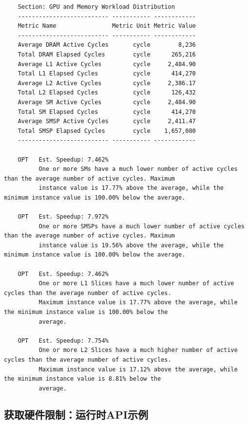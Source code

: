 \begin{lstlisting}
    Section: GPU and Memory Workload Distribution
    -------------------------- ----------- ------------
    Metric Name                Metric Unit Metric Value
    -------------------------- ----------- ------------
    Average DRAM Active Cycles       cycle        8,236
    Total DRAM Elapsed Cycles        cycle      265,216
    Average L1 Active Cycles         cycle     2,484.90
    Total L1 Elapsed Cycles          cycle      414,270
    Average L2 Active Cycles         cycle     2,386.17
    Total L2 Elapsed Cycles          cycle      126,432
    Average SM Active Cycles         cycle     2,484.90
    Total SM Elapsed Cycles          cycle      414,270
    Average SMSP Active Cycles       cycle     2,411.47
    Total SMSP Elapsed Cycles        cycle    1,657,080
    -------------------------- ----------- ------------

    OPT   Est. Speedup: 7.462%
          One or more SMs have a much lower number of active cycles than the average number of active cycles. Maximum
          instance value is 17.77% above the average, while the minimum instance value is 100.00% below the average.
 
    OPT   Est. Speedup: 7.972%
          One or more SMSPs have a much lower number of active cycles than the average number of active cycles. Maximum
          instance value is 19.56% above the average, while the minimum instance value is 100.00% below the average.
    
    OPT   Est. Speedup: 7.462%
          One or more L1 Slices have a much lower number of active cycles than the average number of active cycles.
          Maximum instance value is 17.77% above the average, while the minimum instance value is 100.00% below the
          average.
   
    OPT   Est. Speedup: 7.754%
          One or more L2 Slices have a much higher number of active cycles than the average number of active cycles.
          Maximum instance value is 17.12% above the average, while the minimum instance value is 8.81% below the
          average.

\end{lstlisting}


\subsection{获取硬件限制：运行时API示例}


